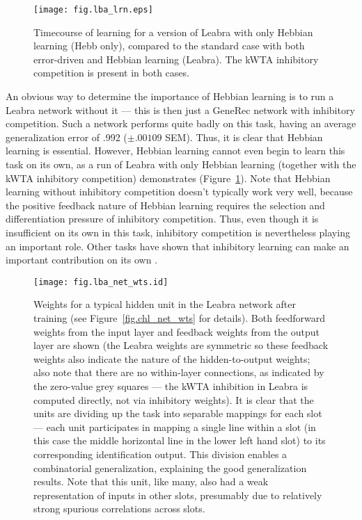 \documentclass[12pt,twoside]{article}
\begin{document}
\begin{figure}
  \centering\texttt{[image: fig.lba\_lrn.eps]}
  \caption{\small Timecourse of learning for a version of Leabra with
    only Hebbian learning (Hebb only), compared to the standard case
    with both error-driven and Hebbian learning (Leabra).  The kWTA
    inhibitory competition is present in both cases.}
  \label{fig.lba_lrn}
\end{figure}

An obvious way to determine the importance of Hebbian learning is to
run a Leabra network without it --- this is then just a GeneRec
network with inhibitory competition.  Such a network performs quite
badly on this task, having an average generalization error of .992
($\pm .00109$ SEM).  Thus, it is clear that Hebbian learning is
essential.  However, Hebbian learning cannot even begin to learn this
task on its own, as a run of Leabra with only Hebbian learning
(together with the kWTA inhibitory competition) demonstrates
(Figure~\ref{fig.lba_lrn}).  Note that Hebbian learning without
inhibitory competition doesn't typically work very well, because the
positive feedback nature of Hebbian learning requires the selection
and differentiation pressure of inhibitory competition.  Thus, even
though it is insufficient on its own in this task, inhibitory
competition is nevertheless playing an important role.  Other tasks
have shown that inhibitory learning can make an important contribution
on its own \cite{OReillyMunakata00}.

\begin{figure}
  \centering\texttt{[image: fig.lba\_net\_wts.id]}
  \caption{\small Weights for a typical hidden unit in the Leabra
    network after training (see Figure~\protect\ref{fig.chl_net_wts}
    for details).  Both feedforward weights from the input layer and
    feedback weights from the output layer are shown (the Leabra
    weights are symmetric so these feedback weights also indicate the
    nature of the hidden-to-output weights; also note that there are
    no within-layer connections, as indicated by the zero-value grey
    squares --- the kWTA inhibition in Leabra is computed directly,
    not via inhibitory weights).  It is clear that the units are
    dividing up the task into separable mappings for each slot ---
    each unit participates in mapping a single line within a slot (in
    this case the middle horizontal line in the lower left hand slot)
    to its corresponding identification output.  This division enables
    a combinatorial generalization, explaining the good generalization
    results.  Note that this unit, like many, also had a weak
    representation of inputs in other slots, presumably due to
    relatively strong spurious correlations across slots.}
  \label{fig.lba_net_wts}
\end{figure}
\end{document}

